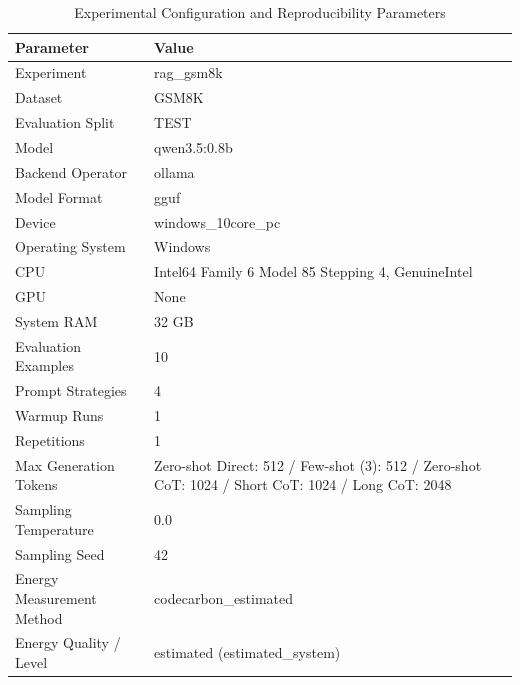 \begin{table}
\caption{Experimental Configuration and Reproducibility Parameters}
\label{tab:experimental_configuration}
\begin{tabular}{ll}
\toprule
Parameter & Value \\
\midrule
Experiment & rag\_gsm8k \\
Dataset & GSM8K \\
Evaluation Split & TEST \\
Model & qwen3.5:0.8b \\
Backend Operator & ollama \\
Model Format & gguf \\
Device & windows\_10core\_pc \\
Operating System & Windows \\
CPU & Intel64 Family 6 Model 85 Stepping 4, GenuineIntel \\
GPU & None \\
System RAM & 32 GB \\
Evaluation Examples & 10 \\
Prompt Strategies & 4 \\
Warmup Runs & 1 \\
Repetitions & 1 \\
Max Generation Tokens & Zero-shot Direct: 512 / Few-shot (3): 512 / Zero-shot CoT: 1024 / Short CoT: 1024 / Long CoT: 2048 \\
Sampling Temperature & 0.0 \\
Sampling Seed & 42 \\
Energy Measurement Method & codecarbon\_estimated \\
Energy Quality / Level & estimated (estimated\_system) \\
\bottomrule
\end{tabular}
\end{table}
